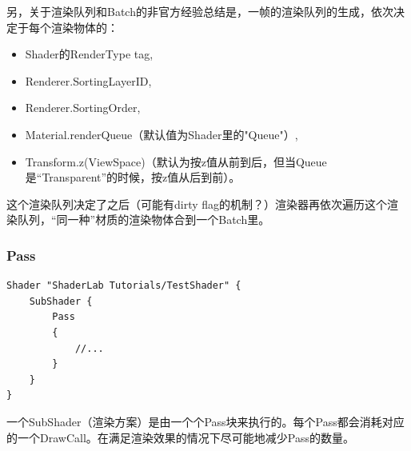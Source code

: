 \documentclass[9pt, b5paper]{article}
\begin{document}
\begin{enumerate}
另，关于渲染队列和Batch的非官方经验总结是，一帧的渲染队列的生成，依次决定于每个渲染物体的：

\begin{itemize}
\item Shader的RenderType tag,
\item Renderer.SortingLayerID,
\item Renderer.SortingOrder,
\item Material.renderQueue（默认值为Shader里的"Queue"）,
\item Transform.z(ViewSpace)（默认为按z值从前到后，但当Queue是“Transparent”的时候，按z值从后到前）。
\end{itemize}

这个渲染队列决定了之后（可能有dirty flag的机制？）渲染器再依次遍历这个渲染队列，“同一种”材质的渲染物体合到一个Batch里。
\end{enumerate}

\subsubsection{Pass}
\label{sec:org0e4896a}
\begin{verbatim}
Shader "ShaderLab Tutorials/TestShader" {
    SubShader {
        Pass
        {
            //...
        }
    }
}
\end{verbatim}
一个SubShader（渲染方案）是由一个个Pass块来执行的。每个Pass都会消耗对应的一个DrawCall。在满足渲染效果的情况下尽可能地减少Pass的数量。
\end{document}
